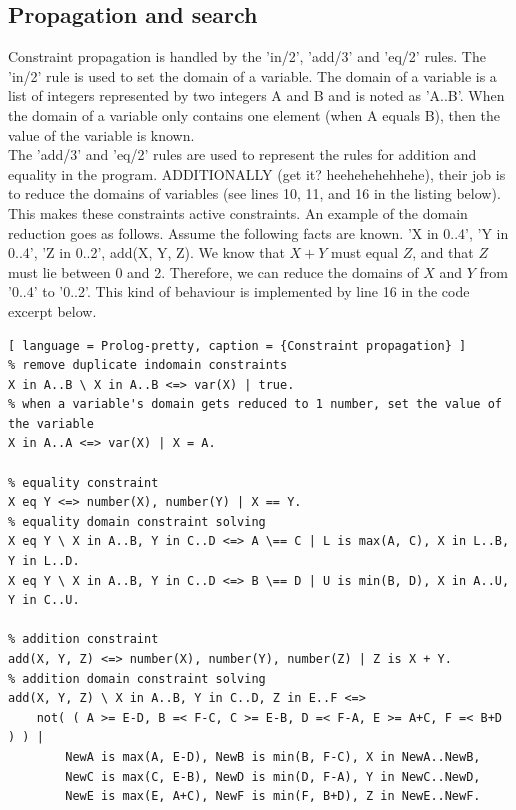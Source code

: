 \documentclass{report}
\begin{document}
\subsection{Propagation and search}
Constraint propagation is handled by the 'in/2', 'add/3' and 'eq/2' rules. The 'in/2' rule is used to set the domain of a variable. The domain of a variable is a list of integers represented by two integers A and B and is noted as 'A..B'. When the domain of a variable only contains one element (when A equals B), then the value of the variable is known. \\
The 'add/3' and 'eq/2' rules are used to represent the rules for addition and equality in the program. ADDITIONALLY (get it? heehehehehhehe), their job is to reduce the domains of variables (see lines 10, 11, and 16 in the listing below). This makes these constraints active constraints.  An example of the domain reduction goes as follows. Assume the following facts are known. 'X in 0..4', 'Y in 0..4', 'Z in 0..2', add(X, Y, Z). We know that \(X + Y\) must equal \(Z\), and that \(Z\) must lie between 0 and 2. Therefore, we can reduce the domains of \(X\) and \(Y\) from '0..4' to '0..2'. This kind of behaviour is implemented by line 16 in the code excerpt below.
\begin{lstlisting}[ language = Prolog-pretty, caption = {Constraint propagation} ]
% remove duplicate indomain constraints
X in A..B \ X in A..B <=> var(X) | true.
% when a variable's domain gets reduced to 1 number, set the value of the variable
X in A..A <=> var(X) | X = A.

% equality constraint
X eq Y <=> number(X), number(Y) | X == Y.
% equality domain constraint solving
X eq Y \ X in A..B, Y in C..D <=> A \== C | L is max(A, C), X in L..B, Y in L..D.
X eq Y \ X in A..B, Y in C..D <=> B \== D | U is min(B, D), X in A..U, Y in C..U.

% addition constraint
add(X, Y, Z) <=> number(X), number(Y), number(Z) | Z is X + Y.
% addition domain constraint solving
add(X, Y, Z) \ X in A..B, Y in C..D, Z in E..F <=>
    not( ( A >= E-D, B =< F-C, C >= E-B, D =< F-A, E >= A+C, F =< B+D ) ) |
        NewA is max(A, E-D), NewB is min(B, F-C), X in NewA..NewB,
        NewC is max(C, E-B), NewD is min(D, F-A), Y in NewC..NewD,
        NewE is max(E, A+C), NewF is min(F, B+D), Z in NewE..NewF.
\end{lstlisting}
\end{document}

